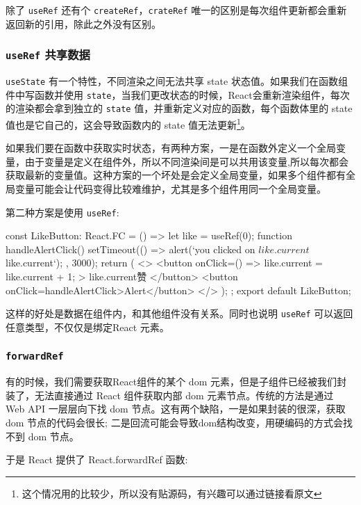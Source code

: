 除了 \texttt{useRef} 还有个 \texttt{createRef}，\texttt{crateRef} 唯一的区别是每次组件更新都会重新返回新的引用，除此之外没有区别。

\subsubsection{\texttt{useRef} 共享数据}

\texttt{useState} 有一个特性，不同渲染之间无法共享 state 状态值。如果我们在函数组件中写函数并使用 \texttt{state}，当我们更改状态的时候，React会重新渲染组件，每次的渲染都会拿到独立的 \texttt{state} 值，并重新定义对应的函数，每个函数体里的 state 值也是它自己的，这会导致函数内的 state 值无法更新\footnote{这个情况用的比较少，所以没有贴源码，有兴趣可以通过链接看原文}。

如果我们要在函数中获取实时状态，有两种方案，一是在函数外定义一个全局变量，由于变量是定义在组件外，所以不同渲染间是可以共用该变量,所以每次都会获取最新的变量值。这种方案的一个坏处是会定义全局变量，如果多个组件都有全局变量可能会让代码变得比较难维护，尤其是多个组件用同一个全局变量。

第二种方案是使用 \texttt{useRef}:

\begin{JavaScript}
const LikeButton: React.FC = () => {
  let like = useRef(0);
  function handleAlertClick() {
    setTimeout(() => {
      alert(`you clicked on ${like.current} ${like.current}`);
    }, 3000);
  }
  return (
    <>
      <button onClick={() => { like.current = like.current + 1; }}>
        {like.current}赞
      </button>
      <button onClick={handleAlertClick}>Alert</button>
    </>
  );
};
export default LikeButton;

\end{JavaScript}

这样的好处是数据在组件内，和其他组件没有关系。同时也说明 \texttt{useRef} 可以返回任意类型，不仅仅是绑定React 元素。

\subsubsection{\texttt{forwardRef}}

有的时候，我们需要获取React组件的某个 dom 元素，但是子组件已经被我们封装了，无法直接通过 React 组件获取内部 dom 元素节点。传统的方法是通过 Web API 一层层向下找 dom 节点。这有两个缺陷，一是如果封装的很深，获取 dom 节点的代码会很长; 二是回流可能会导致dom结构改变，用硬编码的方式会找不到 dom 节点。

于是 React 提供了 React.forwardRef 函数:

